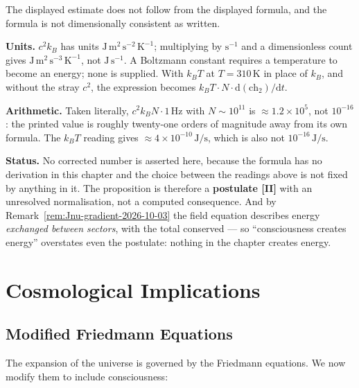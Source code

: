\begin{remark}
\label{rem:dEdt-units-2026-10-03}
The displayed estimate does not follow from the displayed formula, and the formula
is not dimensionally consistent as written.

\textbf{Units.} $c^2 k_B$ has units $\mathrm{J}\,\mathrm{m}^2\,\mathrm{s}^{-2}\,\mathrm{K}^{-1}$;
multiplying by $\mathrm{s}^{-1}$ and a dimensionless count gives
$\mathrm{J}\,\mathrm{m}^2\,\mathrm{s}^{-3}\,\mathrm{K}^{-1}$, not
$\mathrm{J}\,\mathrm{s}^{-1}$. A Boltzmann constant requires a temperature to
become an energy; none is supplied. With $k_B T$ at $T = 310\,\mathrm{K}$ in place
of $k_B$, and without the stray $c^2$, the expression becomes
$k_B T \cdot N \cdot \mathrm{d}(\text{ch}_2)/\mathrm{d}t$.

\textbf{Arithmetic.} Taken literally, $c^2 k_B N \cdot 1\,\mathrm{Hz}$ with
$N \sim 10^{11}$ is $\approx 1.2 \times 10^{5}$, not $10^{-16}$: the printed value
is roughly twenty-one orders of magnitude away from its own formula. The
$k_B T$ reading gives $\approx 4 \times 10^{-10}\,\mathrm{J/s}$, which is also not
$10^{-16}\,\mathrm{J/s}$.

\textbf{Status.} No corrected number is asserted here, because the formula has no
derivation in this chapter and the choice between the readings above is not fixed
by anything in it. The proposition is therefore a \textbf{postulate [II]} with an
unresolved normalisation, not a computed consequence. And by
Remark~\ref{rem:Jnu-gradient-2026-10-03} the field equation describes energy
\emph{exchanged between sectors}, with the total conserved --- so ``consciousness
creates energy'' overstates even the postulate: nothing in the chapter creates
energy.
\end{remark}

\section{Cosmological Implications}

\subsection{Modified Friedmann Equations}

The expansion of the universe is governed by the Friedmann equations. We now modify them to include consciousness:

